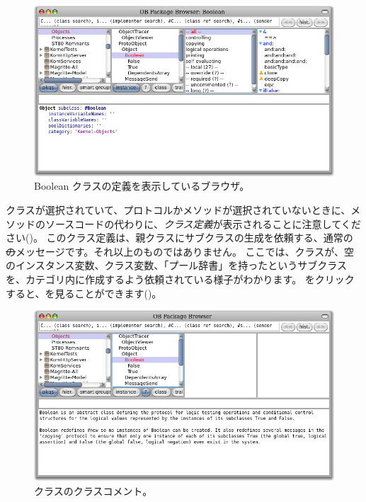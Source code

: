 \documentclass[a4paper,10pt,twoside]{book}
\begin{document}

\begin{figure}[hbt]
\centerline {\includegraphics[width=\textwidth]{Kernel-objects-boolean}}
\caption{Boolean クラスの定義を表示しているブラウザ。
}
\end{figure}

 クラスが選択されていて、プロトコルかメソッドが選択されていないときに、メソッドのソースコードの代わりに、\emph{クラス定義}が表示されることに注意してください()。
このクラス定義は、親クラスにサブクラスの生成を依頼する、通常の \st のメッセージです。それ以上のものではありません。
ここでは、クラスが、空のインスタンス変数、クラス変数、「プール辞書」を持ったというサブクラスを、カテゴリ内に作成するよう依頼されている様子がわかります。
 をクリックすると、を見ることができます()。

\begin{figure}[hbt]
\centerline {\includegraphics[width=\textwidth]{classComment}}
\caption{クラスのクラスコメント。
}
\end{figure}
\end{document}

